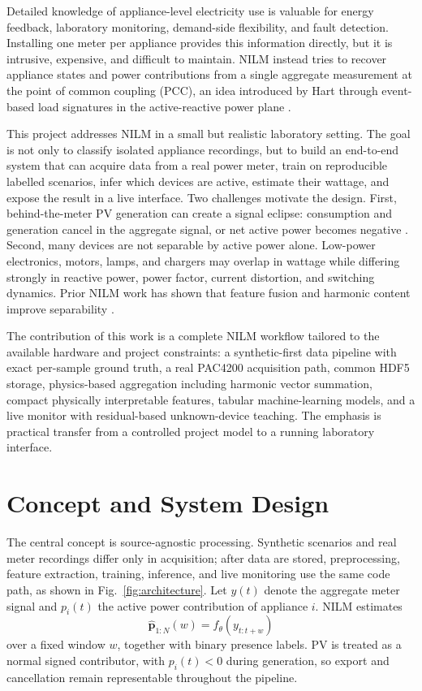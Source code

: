 \documentclass[letterpaper,journal]{IEEEtran}
\begin{document}
Detailed knowledge of appliance-level electricity use is valuable for energy feedback, laboratory monitoring, demand-side flexibility, and fault detection. Installing one meter per appliance provides this information directly, but it is intrusive, expensive, and difficult to maintain. NILM instead tries to recover appliance states and power contributions from a single aggregate measurement at the point of common coupling (PCC), an idea introduced by Hart through event-based load signatures in the active-reactive power plane \cite{hart1992nilm}.

This project addresses NILM in a small but realistic laboratory setting. The goal is not only to classify isolated appliance recordings, but to build an end-to-end system that can acquire data from a real power meter, train on reproducible labelled scenarios, infer which devices are active, estimate their wattage, and expose the result in a live interface. Two challenges motivate the design. First, behind-the-meter PV generation can create a signal eclipse: consumption and generation cancel in the aggregate signal, or net active power becomes negative \cite{wang2025dualnilm}. Second, many devices are not separable by active power alone. Low-power electronics, motors, lamps, and chargers may overlap in wattage while differing strongly in reactive power, power factor, current distortion, and switching dynamics. Prior NILM work has shown that feature fusion and harmonic content improve separability \cite{reddy2020featurefusion,papageorgiou2022odd}.

The contribution of this work is a complete NILM workflow tailored to the available hardware and project constraints: a synthetic-first data pipeline with exact per-sample ground truth, a real PAC4200 acquisition path, common HDF5 storage, physics-based aggregation including harmonic vector summation, compact physically interpretable features, tabular machine-learning models, and a live monitor with residual-based unknown-device teaching. The emphasis is practical transfer from a controlled project model to a running laboratory interface.

\section{Concept and System Design}

The central concept is source-agnostic processing. Synthetic scenarios and real meter recordings differ only in acquisition; after data are stored, preprocessing, feature extraction, training, inference, and live monitoring use the same code path, as shown in Fig.~\ref{fig:architecture}. Let $y(t)$ denote the aggregate meter signal and $p_i(t)$ the active power contribution of appliance $i$. NILM estimates
\begin{equation}
    \hat{\mathbf{p}}_{1:N}(w) = f_{\theta}(y_{t:t+w})
\end{equation}
over a fixed window $w$, together with binary presence labels. PV is treated as a normal signed contributor, with $p_i(t)<0$ during generation, so export and cancellation remain representable throughout the pipeline.
\end{document}

